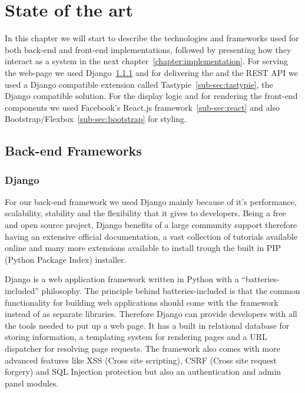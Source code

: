 \chapter{State of the art}
\label{chapter:state}

In this chapter we will start to describe the technologies and frameworks used for both back-end and front-end implementations, followed by presenting how they interact as a system in the next chapter~\ref{chapter:implementation}. For serving the web-page we used Django~\ref{sub-sec:django} and for delivering the and the REST API we used a Django compatible extension called Tastypie~\ref{sub-sec:tastypie}, the Django compatible solution. For the display logic and for rendering the front-end components we used Facebook's React.js framework~\ref{sub-sec:react} and also Bootstrap/Flexbox~\ref{sub-sec:bootstrap} for styling.

\section{Back-end Frameworks}
\label{sec:backend}

\subsection{Django}
\label{sub-sec:django}

For our back-end framework we used Django mainly because of it's performance, scalability, stability and the flexibility that it gives to developers. Being a free and open source project, Django benefits of a large community support therefore having an extensive official documentation, a vast collection of tutorials available online and many more extensions available to install trough the built in PIP (Python Package Index) installer.

Django is a web application framework written in Python with a ``batteries-included'' philosophy. The principle behind batteries-included is that the common functionality for building web applications should come with the framework instead of as separate libraries. Therefore Django can provide developers with all the tools needed to put up a web page. It has a built in relational database for storing information, a templating system for rendering pages and a URL dispatcher for resolving page requests. The framework also comes with more advanced features like XSS (Cross site scripting), CSRF (Cross site request forgery) and SQL Injection protection but also an authentication and admin panel modules.

